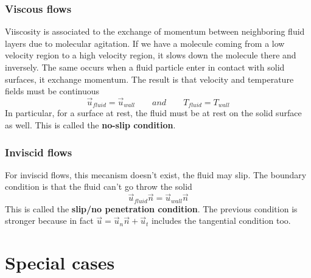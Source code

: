 		\subsubsection{Viscous flows}
			Viiscosity is associated to the exchange of momentum between neighboring fluid layers due to molecular agitation. If we have a molecule coming from a low velocity region to a high velocity region, it slows down the molecule there and inversely. The same occurs when a fluid particle enter in contact with solid surfaces, it exchange momentum. The result is that velocity and temperature fields must be continuous 
			\begin{equation}
				\vec{u}_{fluid} = \vec{u}_{wall} \qquad and \qquad T_{fluid} = T_{wall}
			\end{equation}
			In particular, for a surface at rest, the fluid must be at rest on the solid surface as well. This is called the \textbf{no-slip condition}. 
		
		\subsubsection{Inviscid flows} 
			For inviscid flows, this mecanism doesn't exist, the fluid may slip. The boundary condition is that the fluid can't go throw the solid
			\begin{equation}
				\vec{u}_{fluid}\vec{n} = \vec{u}_{wall}\vec{n}
			\end{equation}
			This is called the \textbf{slip/no penetration condition}. The previous condition is stronger because in fact $\vec{u} = \vec{u}_n\vec{n}+\vec{u}_t$ includes the tangential condition too. 
			
\section{Special cases}
